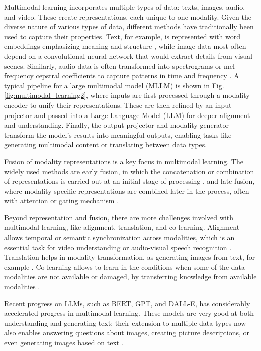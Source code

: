 \documentclass[runningheads]{llncs}
\begin{document}
Multimodal learning incorporates multiple types of data: texts, images, audio, and video. These create representations, each unique to one modality. Given the diverse nature of various types of data, different methods have traditionally been used to capture their properties. Text, for example, is represented with word embeddings emphasizing meaning and structure \cite{ref12}, while image data most often depend on a convolutional neural network that would extract details from visual scenes. Similarly, audio data is often transformed into spectrograms or mel-frequency cepstral coefficients to capture patterns in time and frequency \cite{ref13}. A typical pipeline for a large multimodal model (MLLM) is shown in Fig. \ref{fig:multimodal_learning2}, where inputs are first processed through a modality encoder to unify their representations. These are then refined by an input projector and passed into a Large Language Model (LLM) for deeper alignment and understanding. Finally, the output projector and modality generator transform the model's results into meaningful outputs, enabling tasks like generating multimodal content or translating between data types.

Fusion of modality representations is a key focus in multimodal learning. The widely used methods are early fusion, in which the concatenation or combination of representations is carried out at an initial stage of processing \cite{ref14}, and late fusion, where modality-specific representations are combined later in the process, often with attention or gating mechanism \cite{ref14}.

Beyond representation and fusion, there are more challenges involved with multimodal learning, like alignment, translation, and co-learning. Alignment allows temporal or semantic synchronization across modalities, which is an essential task for video understanding or audio-visual speech recognition \cite{ref16}. Translation helps in modality transformation, as generating images from text, for example \cite{ref17}. Co-learning allows to learn in the conditions when some of the data modalities are not available or damaged, by transferring knowledge from available modalities \cite{ref13}.

Recent progress on LLMs, such as BERT, GPT, and DALL-E, has considerably accelerated progress in multimodal learning. These models are very good at both understanding and generating text; their extension to multiple data types now also enables answering questions about images, creating picture descriptions, or even generating images based on text \cite{ref19}.
\end{document}
